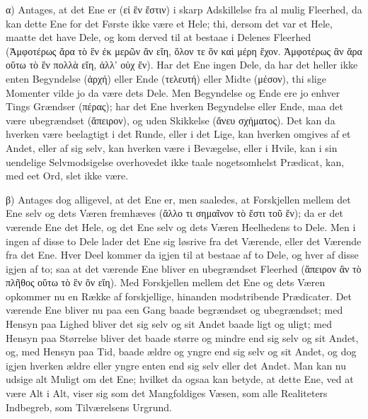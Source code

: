 \documentclass[12pt]{book}
\newcommand{\opage}[1]{\marginnote{\footnotesize\textit{[#1]}}}
\begin{document}
α) Antages, at det Ene er (εἰ ἓν ἔστιν) i skarp Adskillelse fra al mulig Fleerhed, da kan dette
Ene for det Første ikke være et Hele; thi, dersom det var et Hele, maatte det have Dele, og kom
derved til at bestaae i Delenes Fleerhed (Ἀμφοτέρως ἄρα τὸ ἓν ἐκ μερῶν ἂν εἴη, ὅλον τε ὂν καὶ
μέρη ἔχον. Ἀμφοτέρως ἂν ἄρα οὕτω τὸ ἓν πολλὰ εἴη, ἀλλ' οὐχ ἕν). Har det Ene ingen Dele, da har det
heller
\opage{132} ikke enten Begyndelse (ἀρχή) eller Ende (τελευτή) eller Midte (μέσον), thi slige Momenter vilde
jo da være dets Dele. Men Begyndelse og Ende ere jo enhver Tings Grændser (πέρας); har det Ene
hverken Begyndelse eller Ende, maa det være ubegrændset (ἄπειρον), og uden Skikkelse (ἄνευ
σχήματος). Det kan da hverken være beelagtigt i det Runde, eller i det Lige, kan hverken omgives
af et Andet, eller af sig selv, kan hverken være i Bevægelse, eller i Hvile, kan i sin uendelige
Selvmodsigelse overhovedet ikke taale nogetsomhelst Prædicat, kan, med eet Ord, slet ikke være.

β) Antages dog alligevel, at det Ene er, men saaledes, at Forskjellen mellem det Ene selv og
dets Væren fremhæves (ἄλλο τι σημαῖνον τὸ ἔστι τοῦ ἕν); da er det værende Ene det Hele, og det Ene
selv og dets Væren Heelhedens to Dele. Men i ingen af disse to Dele lader det Ene sig løsrive fra
det Værende, eller det Værende fra det Ene. Hver Deel kommer da igjen til at bestaae af to Dele,
og hver af disse igjen af to; saa at det værende Ene bliver en ubegrændset Fleerhed (ἄπειρον ἂν
τὸ πλῆθος οὕτω τὸ ἓν ὂν εἴη). Med Forskjellen mellem det Ene og dets Væren opkommer nu en Række af
forskjellige, hinanden modstribende Prædicater. Det værende Ene bliver nu paa een Gang baade
begrændset og ubegrændset; med Hensyn paa Lighed bliver det sig selv og sit Andet baade ligt og
uligt; med Hensyn paa Størrelse bliver det baade større og mindre end sig selv og sit Andet, og,
med Hensyn paa Tid, baade ældre og yngre end sig selv og sit Andet, og dog igjen hverken ældre
eller yngre enten end sig selv eller det Andet. Man kan nu udsige alt Muligt om det Ene; hvilket
da ogsaa kan betyde, at dette Ene, ved at være Alt i Alt, viser sig som det Mangfoldiges Væsen,
som alle Realiteters Indbegreb, som Tilværelsens Urgrund.
\end{document}
